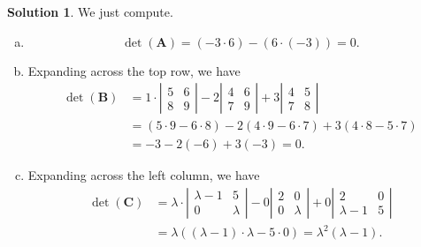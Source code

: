 \documentclass[12pt]{report} %
\theoremstyle{definition}
\newtheorem{solution}{Solution}
\begin{document}
\begin{solution}
We just compute.
\begin{enumerate}[(a)]
    \item 
    \[
    \det(\mathbf{A})=(-3\cdot 6)-(6\cdot (-3))=0.
    \]
    
    \item Expanding across the top row, we have
    \begin{align*}
    \det(\mathbf{B})&=1\cdot \left|\begin{array}{cc}
        5 & 6 \\
        8 & 9
    \end{array}\right| -2 \left|\begin{array}{cc}
        4 & 6 \\
        7 & 9
    \end{array}\right| +3\left| \begin{array}{cc}
        4 & 5 \\
        7 & 8
    \end{array}\right|\\
    &= (5\cdot 9 - 6\cdot 8)-2(4\cdot 9 - 6\cdot 7)+3(4\cdot 8-5\cdot 7)\\
    &= -3-2(-6)+3(-3)=0.
    \end{align*}
    
    \item Expanding across the left column, we have
    \begin{align*}
    \det(\mathbf{C})&=\lambda \cdot \left|\begin{array}{cc}
        \lambda -1 & 5 \\
        0 & \lambda
    \end{array}\right| -0 \left|\begin{array}{cc}
        2 & 0 \\
        0 & \lambda
    \end{array}\right| +0\left| \begin{array}{cc}
        2 & 0 \\
        \lambda -1 & 5
    \end{array}\right|\\
    &= \lambda ((\lambda-1)\cdot \lambda - 5\cdot 0)=\lambda^2(\lambda-1).
    \end{align*}
\end{enumerate}
\end{solution}
\end{document}
